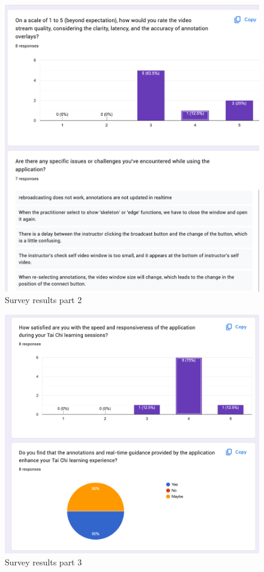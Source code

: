\documentclass[12pt, titlepage]{article}
\begin{document}
\begin{figure}[h]
  \centering
  \includegraphics[width=1.0\linewidth]{surveyp2.png}
  \caption{Survey results part 2}
  \label{fig:surveyp2}
\end{figure}

\begin{figure}[h]
  \centering
  \includegraphics[width=1.0\linewidth]{surveyp3.png}
  \caption{Survey results part 3}
  \label{fig:surveyp3}
\end{figure}
\end{document}
